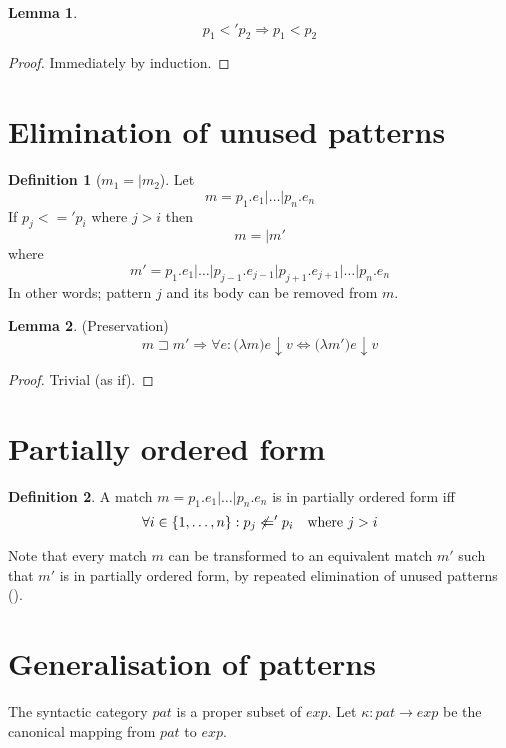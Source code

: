 \documentclass[a4paper, oneside, draft]{memoir}
\let\fref\undefined
\theoremstyle{definition}
\newtheorem{definition}{Definition}
\newtheorem{lemma}{Lemma}
\begin{document}
\begin{lemma}\label{part-imp-tot}
  \[
  p_1 <' p_2 \Rightarrow p_1 < p_2
  \]
\end{lemma}
\begin{proof}
  Immediately by induction.
\end{proof}

\section{Elimination of unused patterns}\label{sec:elim-unus-patt}
\begin{definition}[$m_1 =| m_2$]
  Let
  \[
  m = p_1\texttt{.}e_1 \texttt{|} \ldots \texttt{|} p_n\texttt{.}e_n
  \]
  If $p_j <=' p_i$ where $j > i$ then 
  \[
  m =| m'
  \]
  where
  \[
  m' = p_1\texttt{.}e_1 \texttt{|} \ldots \texttt{|}
  p_{j-1}\texttt{.}e_{j-1} \texttt{|} p_{j+1}\texttt{.}e_{j+1} \texttt{|}
  \ldots \texttt{|} p_n\texttt{.}e_n
  \]
  In other words; pattern $j$ and its body can be removed from $m$.
\end{definition}

\begin{lemma}(Preservation)
  \[
  m \sqsupset m' \Rightarrow \forall e : \texttt{(}\lambda m\texttt{)}e \downarrow
  v \Leftrightarrow \texttt{(}\lambda m'\texttt{)}e \downarrow v
  \]
\end{lemma}
\begin{proof}
  Trivial (as if).
\end{proof}

\section{Partially ordered form}
\begin{definition}
  A match $m = p_1\texttt{.}e_1\texttt{|}\ldots\texttt{|}p_n\texttt{.}e_n$ is in
  partially ordered form iff
  \[
  \forall i \in \{1, \ldots, n\} : p_j \not <=' p_i \quad \textnormal{where $j > i$}
  \]

  Note that every match $m$ can be transformed to an equivalent match $m'$ such
  that $m'$ is in partially ordered form, by repeated elimination of unused
  patterns (\fref{sec:elim-unus-patt}).
\end{definition}

\section{Generalisation of patterns}
The syntactic category $pat$ is a proper subset of $exp$. Let $\kappa : pat
\rightarrow exp$ be the canonical mapping from $pat$ to $exp$.
\end{document}
